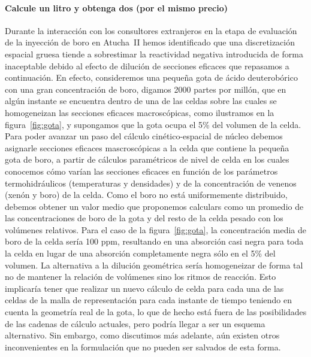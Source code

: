 \paragraph{Calcule un litro y obtenga dos (por el mismo precio)}
Durante la interacción con los consultores extranjeros en la etapa de evaluación de la inyección de boro en Atucha~II hemos identificado que una discretización espacial gruesa tiende a sobrestimar la reactividad negativa introducida de forma inaceptable debido al efecto de dilución de secciones eficaces que repasamos a continuación. En efecto, consideremos una pequeña gota de ácido deuterobórico con una gran concentración de boro, digamos 2000 partes por millón, que en algún instante se encuentra dentro de una de las celdas sobre las cuales se homogeneizan las secciones eficaces macroscópicas, como ilustramos en la figura~\ref{fig:gota}, y supongamos que la gota ocupa el 5\% del volumen de la celda. Para poder avanzar un paso del cálculo cinético-espacial de núcleo debemos asignarle secciones eficaces mascroscópicas a la celda que contiene la pequeña gota de boro, a partir de cálculos paramétricos de nivel de celda en los cuales conocemos cómo varían las secciones eficaces en función de los parámetros 
termohidráulicos (temperaturas y densidades) y de la concentración de venenos (xenón y boro) de la celda. Como el boro no está uniformemente distribuido, debemos obtener un valor medio que proponemos calculars como un promedio de las concentraciones de boro de la gota y del resto de la celda pesado con los volúmenes relativos. Para el caso de la figura~\ref{fig:gota}, la concentración media de boro de la celda sería 100 ppm, resultando en una absorción casi negra para toda la celda en lugar de una absorción completamente negra sólo en el 5\% del volumen. La alternativa a la dilución geométrica sería homogeneizar de forma tal no de mantener la relación de volúmenes sino los ritmos de reacción. Esto implicaría tener que realizar un nuevo cálculo de celda para cada una de las celdas de la malla de representación para cada instante de tiempo teniendo en cuenta la geometría real de la gota, lo que de hecho está fuera de las posibilidades de las cadenas de cálculo actuales, pero podría llegar a ser un esquema alternativo. Sin embargo, como discutimos más adelante, aún existen otros inconvenientes en la formulación que no pueden ser salvados de esta forma.


